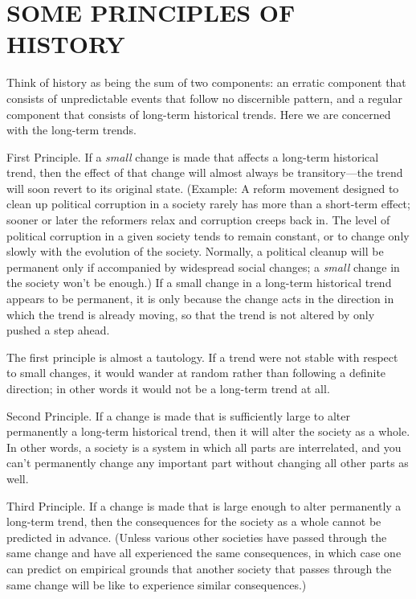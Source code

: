 \chapter{SOME PRINCIPLES OF HISTORY}

 Think of history as being the sum of two components: an erratic component that consists of unpredictable events that follow no discernible pattern, and a regular component that consists of long-term historical trends. Here we are concerned with the long-term trends.

 {\sc First Principle.} If a {\em small} change is made that affects a long-term historical trend, then the effect of that change will almost always be transitory—the trend will soon revert to its original state. (Example: A reform movement designed to clean up political corruption in a society rarely has more than a short-term effect; sooner or later the reformers relax and corruption creeps back in. The level of political corruption in a given society tends to remain constant, or to change only slowly with the evolution of the society. Normally, a political cleanup will be permanent only if accompanied by widespread social changes; a {\em small} change in the society won’t be enough.) If a small change in a long-term historical trend appears to be permanent, it is only because the change acts in the direction in which the trend is already moving, so that the trend is not altered by only pushed a step ahead.

 The first principle is almost a tautology. If a trend were not stable with respect to small changes, it would wander at random rather than following a definite direction; in other words it would not be a long-term trend at all.

 {\sc Second Principle.} If a change is made that is sufficiently large to alter permanently a long-term historical trend, then it will alter the society as a whole. In other words, a society is a system in which all parts are interrelated, and you can’t permanently change any important part without changing all other parts as well.

 {\sc Third Principle.} If a change is made that is large enough to alter permanently a long-term trend, then the consequences for the society as a whole cannot be predicted in advance. (Unless various other societies have passed through the same change and have all experienced the same consequences, in which case one can predict on empirical grounds that another society that passes through the same change will be like to experience similar consequences.)

